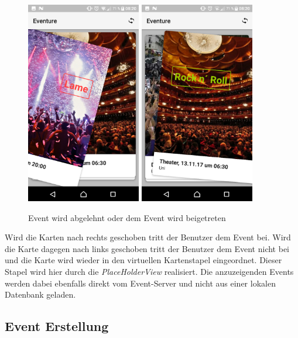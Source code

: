 \documentclass{scrartcl}
\begin{document}
\begin{figure}[h!tbp]
  \centering
  \includegraphics[width=5cm]{img/cardview_lame}
  \hspace{1cm}
  \includegraphics[width=5cm]{img/cardview_rocknroll}
  \caption{Event wird abgelehnt oder dem Event wird beigetreten}
\end{figure}

Wird die Karten nach rechts geschoben tritt der Benutzer dem Event bei. Wird die
Karte dagegen nach links geschoben tritt der Benutzer dem Event nicht bei und
die Karte wird wieder in den virtuellen Kartenstapel eingeordnet. Dieser Stapel
wird hier durch die \emph{PlaceHolderView} realisiert. Die anzuzeigenden Events
werden dabei ebenfalls direkt vom Event-Server und nicht aus einer lokalen
Datenbank geladen.

\subsection{Event Erstellung}
\end{document}
